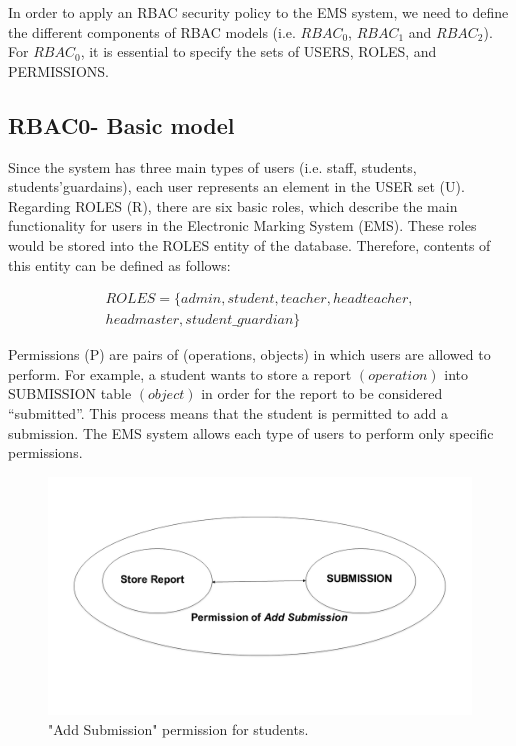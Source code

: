 In order to apply an RBAC security policy to the EMS system, we need to define the different components of RBAC models (i.e. $RBAC_0$, $RBAC_1$ and $RBAC_2$).  For $RBAC_0$, it is essential to specify the sets of USERS, ROLES, and PERMISSIONS.

\subsection{RBAC0- Basic model}
Since the system has three main types of users (i.e. staff, students, students’guardains), each user represents an element in the USER set (U).  Regarding ROLES (R), there are six basic roles, which describe the main functionality for users in the Electronic Marking System (EMS).  These roles would be stored into the ROLES entity of the database.  Therefore, contents of this entity can be defined as follows:

\begin{align*}
ROLES = \{admin, student, teacher, headteacher, \\headmaster, student\_guardian\}
\end{align*}


Permissions (P) are pairs of (operations, objects) in which users are allowed to perform.  For example, a student wants to store a report $(operation)$ into SUBMISSION table $(object)$ in order for the report to be considered “submitted”.  This process means that the student is permitted to add a submission.  The EMS system allows each type of users to perform only specific permissions. 

\begin{figure}[bht]
\centering
\includegraphics[scale=0.26]{addsubmission.png}
\caption{"Add Submission" permission for students.}
\label{fig:permstud}
\end{figure}


